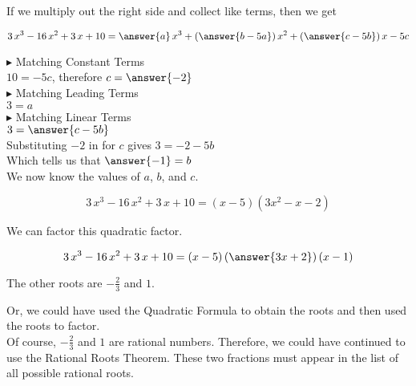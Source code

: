 \documentclass{ximera}
\begin{document}
\begin{example}
If we multiply out the right side and collect like terms, then we get


\[
3\, x^3 - 16 \, x^2 + 3 \, x + 10 = \answer{a} \, x^3 + \left( \answer{b-5a} \right) x^2 + \left( \answer{c-5b} \right) x - 5c
\]



$\blacktriangleright$ Matching Constant Terms \\


$10 = -5c$, therefore $c = \answer{-2}$ \\



$\blacktriangleright$ Matching Leading Terms \\


$3 = a$ \\



$\blacktriangleright$ Matching Linear Terms \\

$3 = \answer{c-5b}$ \\

Substituting $-2$ in for $c$ gives $3 = -2 - 5b$ \\

Which tells us that $\answer{-1} = b$ \\



We now know the values of $a$, $b$, and $c$.


\[
3\, x^3 - 16 \, x^2 + 3 \, x + 10  = (x - 5) (3 x^2 -  x - 2) 
\]


We can factor this quadratic factor.

\[
3\, x^3 - 16 \, x^2 + 3 \, x + 10  = (x - 5) \left(\answer{3x + 2} \right) (x - 1) 
\]


The other roots are $-\frac{2}{3}$ and $1$. 


Or, we could have used the Quadratic Formula to obtain the roots and then used the roots to factor. \\


Of course, $-\frac{2}{3}$ and $1$ are rational numbers.  Therefore, we could have continued to use the Rational Roots Theorem.  These two fractions must appear in the list of all possible rational roots.








\end{example}
\end{document}
